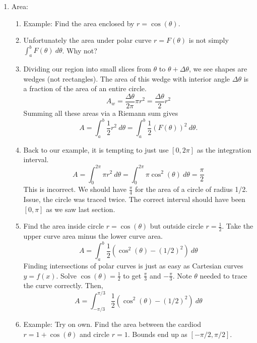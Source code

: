 \documentclass{article}
\begin{document}
\begin{enumerate}
\item Area: 
\begin{enumerate}
\item Example: Find the area enclosed by $r=\cos(\theta)$. 
\item Unfortunately the area under polar curve $r=F(\theta)$ is not simply $\int_a^b F(\theta)~d\theta$. Why not?
\item Dividing our region into small slices from $\theta$ to $\theta+\Delta \theta$, we see shapes are wedges (not rectangles). The area of this wedge with interior angle $\Delta \theta$ is a fraction of the area of an entire circle.
\[
A_w = \frac{\Delta \theta}{2\pi} \pi r^2 = \frac{\Delta \theta}{2} r^2
\]
Summing all these areas via a Riemann sum gives
\[
A = \int_a^b \frac{1}{2} r^2 ~d\theta = \int_a^b \frac{1}{2} (F(\theta))^2 ~d\theta.
\]
\item Back to our example, it is tempting to just use $[0,2\pi]$ as the integration interval.
\[
A = \int_0^{2\pi} \pi r^2 ~d\theta
 = \int_0^{2\pi} \pi \cos^2(\theta) ~d\theta = \frac{\pi}{2}
\]
This is incorrect. We should have $\frac{\pi}{4}$ for the area of a circle of radius 1/2. Issue, the circle was traced twice. The correct interval should have been $[0,\pi]$ as we saw last section.
\item Find the area inside circle $r=\cos(\theta)$ but outside circle $r=\frac{1}{2}$. Take the upper curve area minus the lower curve area.
\[
A = \int_a^b \frac{1}{2}(\cos^2(\theta)-(1/2)^2) ~d\theta
\]
Finding intersections of polar curves is just as easy as Cartesian curves $y=f(x)$. Solve $\cos(\theta)=\frac{1}{2}$ to get $\frac{\pi}{3}$ and $-\frac{\pi}{3}$. Note $\theta$ needed to trace the curve correctly. Then,
\[
A = \int_{-\pi/3}^{\pi/3} \frac{1}{2}(\cos^2(\theta)-(1/2)^2) ~d\theta
\]
\item Example: Try on own. Find the area between the cardiod $r=1+\cos(\theta)$ and circle $r=1$. Bounds end up as $[-\pi/2,\pi/2]$.
\end{enumerate}


\end{enumerate}
\end{document}
